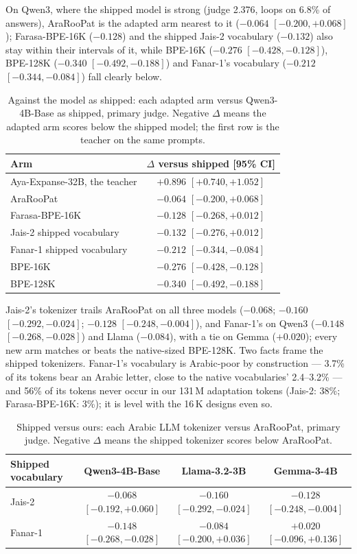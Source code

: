\documentclass[a4paper,fleqn]{cas-sc}
\begin{document}
On Qwen3, where the shipped model is strong (judge 2.376, loops on 6.8\% of answers), AraRooPat is the adapted arm nearest to it ($-0.064$ $[-0.200,+0.068]$); Farasa-BPE-16K ($-0.128$) and the shipped Jais-2 vocabulary ($-0.132$) also stay within their intervals of it, while BPE-16K ($-0.276$ $[-0.428,-0.128]$), BPE-128K ($-0.340$ $[-0.492,-0.188]$) and Fanar-1's vocabulary ($-0.212$ $[-0.344,-0.084]$) fall clearly below.

\begin{table}[t]
\centering
\caption{Against the model as shipped: each adapted arm versus Qwen3-4B-Base as shipped, primary judge. Negative $\Delta$ means the adapted arm scores below the shipped model; the first row is the teacher on the same prompts.}
\label{tab:shipped}
\begin{tabular}{@{}lc@{}}
\toprule
Arm & $\Delta$ versus shipped [95\% CI] \\
\midrule
Aya-Expanse-32B, the teacher & $+0.896$ $[+0.740,+1.052]$ \\
\midrule
AraRooPat & $-0.064$ $[-0.200,+0.068]$ \\
Farasa-BPE-16K & $-0.128$ $[-0.268,+0.012]$ \\
Jais-2 shipped vocabulary & $-0.132$ $[-0.276,+0.012]$ \\
Fanar-1 shipped vocabulary & $-0.212$ $[-0.344,-0.084]$ \\
BPE-16K & $-0.276$ $[-0.428,-0.128]$ \\
BPE-128K & $-0.340$ $[-0.492,-0.188]$ \\
\bottomrule
\end{tabular}
\end{table}

Jais-2's tokenizer trails AraRooPat on all three models ($-0.068$; $-0.160$ $[-0.292,-0.024]$; $-0.128$ $[-0.248,-0.004]$), and Fanar-1's on Qwen3 ($-0.148$ $[-0.268,-0.028]$) and Llama ($-0.084$), with a tie on Gemma ($+0.020$); every new arm matches or beats the native-sized BPE-128K. Two facts frame the shipped tokenizers. Fanar-1's vocabulary is Arabic-poor by construction --- 3.7\% of its tokens bear an Arabic letter, close to the native vocabularies' 2.4--3.2\% --- and 56\% of its tokens never occur in our 131\,M adaptation tokens (Jais-2: 38\%; Farasa-BPE-16K: 3\%); it is level with the 16\,K designs even so.

\begin{table}[t]
\centering
\caption{Shipped versus ours: each Arabic LLM tokenizer versus AraRooPat, primary judge. Negative $\Delta$ means the shipped tokenizer scores below AraRooPat.}
\label{tab:shipped-vs}
\begin{tabular}{@{}lccc@{}}
\toprule
Shipped vocabulary & Qwen3-4B-Base & Llama-3.2-3B & Gemma-3-4B \\
\midrule
Jais-2 & $-0.068$ $[-0.192,+0.060]$ & $-0.160$ $[-0.292,-0.024]$ & $-0.128$ $[-0.248,-0.004]$ \\
Fanar-1 & $-0.148$ $[-0.268,-0.028]$ & $-0.084$ $[-0.200,+0.036]$ & $+0.020$ $[-0.096,+0.136]$ \\
\bottomrule
\end{tabular}
\end{table}
\end{document}
